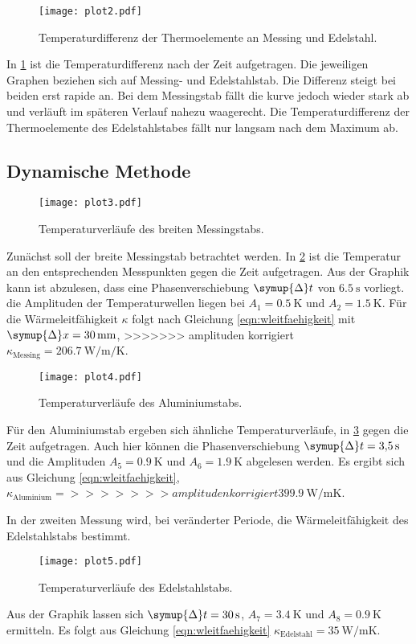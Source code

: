 \begin{figure}[H]
    \centering
    \texttt{[image: plot2.pdf]}
    \caption{Temperaturdifferenz der Thermoelemente an Messing und Edelstahl.}
    \label{fig:plot2}
\end{figure}


In \ref{fig:plot2} ist die Temperaturdifferenz nach der Zeit aufgetragen.
Die jeweiligen Graphen beziehen sich auf Messing- und Edelstahlstab.
Die Differenz steigt bei beiden erst rapide an.
Bei dem Messingstab fällt die kurve jedoch wieder stark ab und verläuft im späteren Verlauf nahezu waagerecht.
Die Temperaturdifferenz der Thermoelemente des Edelstahlstabes fällt nur langsam nach dem Maximum ab.


\subsection{Dynamische Methode}
\begin{figure}
    \centering
    \texttt{[image: plot3.pdf]}
    \caption{Temperaturverläufe des breiten Messingstabs.}
    \label{fig:plot3}
\end{figure}
Zunächst soll der breite Messingstab betrachtet werden.
In \ref{fig:plot3} ist die Temperatur an den entsprechenden Messpunkten gegen die Zeit aufgetragen. Aus der Graphik kann ist abzulesen, 
dass eine Phasenverschiebung $\symup{\Delta} t$ von $\SI{6.5}{\second}$ vorliegt. die Amplituden der Temperaturwellen liegen 
bei $A_1 = \SI{0.5}{\kelvin}$ und $A_2 = \SI{1.5}{\kelvin}$.
Für die Wärmeleitfähigkeit $\kappa$ folgt nach Gleichung \eqref{eqn:wleitfaehigkeit} mit $\symup{\Delta}x = \SI{30}{\milli\meter}$, 
>>>>>>> amplituden korrigiert
$\kappa_\text{Messing} = \SI{206.7}{\watt\per\meter\per\kelvin}$.
\begin{figure}
    \centering
    \texttt{[image: plot4.pdf]}
    \caption{Temperaturverläufe des Aluminiumstabs.}
    \label{fig:plot4}
\end{figure}

Für den Aluminiumstab ergeben sich ähnliche Temperaturverläufe, in \ref{fig:plot4} gegen die Zeit aufgetragen. Auch hier können die 
Phasenverschiebung $\symup{\Delta} t = \SI{3.5}{\second}$ und die Amplituden $A_5 = 
\SI{0.9}{\kelvin}$ und $A_6 = \SI{1.9}{\kelvin}$ 
abgelesen werden. Es ergibt sich aus Gleichung \eqref{eqn:wleitfaehigkeit}, $\kappa_\text{Aluminium} = 
>>>>>>> amplituden korrigiert
\SI{399.9}{\watt\per\meter\kelvin}$.

In der zweiten Messung wird, bei veränderter Periode, die Wärmeleitfähigkeit des Edelstahlstabs bestimmt.
\begin{figure}[H]
    \centering
    \texttt{[image: plot5.pdf]}
    \caption{Temperaturverläufe des Edelstahlstabs.}
    \label{fig:plot5}
\end{figure}
Aus der Graphik lassen sich $\symup{\Delta} t = \SI{30}{\second}$, $A_7 = \SI{3.4}{\kelvin}$ 
und $A_8 = \SI{0.9}{\kelvin}$ ermitteln.
Es folgt aus Gleichung \eqref{eqn:wleitfaehigkeit} $\kappa_\text{Edelstahl} = 
\SI{35}{\watt\per\meter\kelvin}$.

